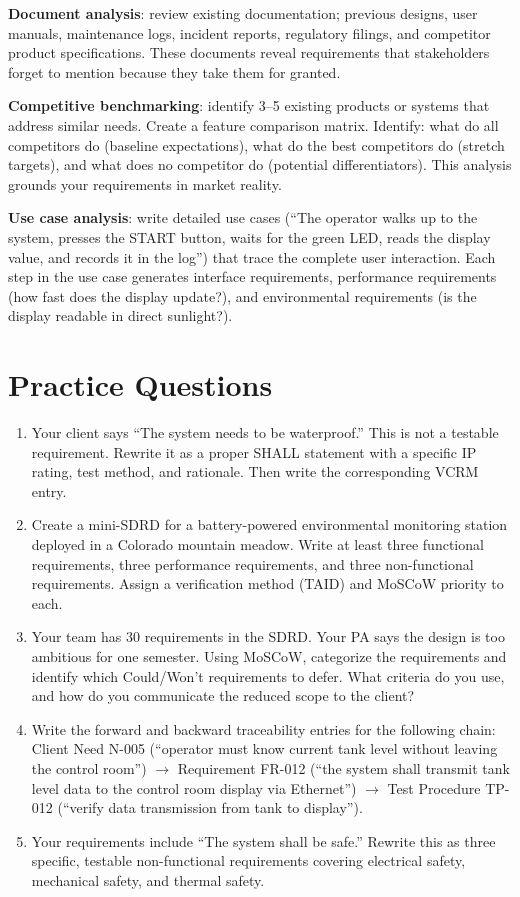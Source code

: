\textbf{Document analysis}: review existing documentation; previous designs, user manuals, maintenance logs, incident reports, regulatory filings, and competitor product specifications. These documents reveal requirements that stakeholders forget to mention because they take them for granted.

\textbf{Competitive benchmarking}: identify 3--5 existing products or systems that address similar needs. Create a feature comparison matrix. Identify: what do all competitors do (baseline expectations), what do the best competitors do (stretch targets), and what does no competitor do (potential differentiators). This analysis grounds your requirements in market reality.

\textbf{Use case analysis}: write detailed use cases (``The operator walks up to the system, presses the START button, waits for the green LED, reads the display value, and records it in the log'') that trace the complete user interaction. Each step in the use case generates interface requirements, performance requirements (how fast does the display update?), and environmental requirements (is the display readable in direct sunlight?).


\section{Practice Questions}
\begin{enumerate}[leftmargin=1.5em]
\item Your client says ``The system needs to be waterproof.'' This is not a testable requirement. Rewrite it as a proper SHALL statement with a specific IP rating, test method, and rationale. Then write the corresponding VCRM entry.
\item Create a mini-SDRD for a battery-powered environmental monitoring station deployed in a Colorado mountain meadow. Write at least three functional requirements, three performance requirements, and three non-functional requirements. Assign a verification method (TAID) and MoSCoW priority to each.
\item Your team has 30 requirements in the SDRD. Your PA says the design is too ambitious for one semester. Using MoSCoW, categorize the requirements and identify which Could/Won't requirements to defer. What criteria do you use, and how do you communicate the reduced scope to the client?
\item Write the forward and backward traceability entries for the following chain: Client Need N-005 (``operator must know current tank level without leaving the control room'') $\to$ Requirement FR-012 (``the system shall transmit tank level data to the control room display via Ethernet'') $\to$ Test Procedure TP-012 (``verify data transmission from tank to display'').
\item Your requirements include ``The system shall be safe.'' Rewrite this as three specific, testable non-functional requirements covering electrical safety, mechanical safety, and thermal safety.
\end{enumerate}



